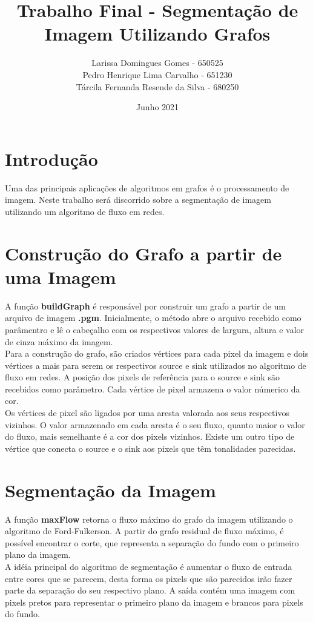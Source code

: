 \documentclass{article}
\title{Trabalho Final - Segmentação de Imagem Utilizando Grafos}
\author{Larissa Domingues Gomes - 650525 \\
Pedro Henrique Lima Carvalho - 651230\\
Tárcila Fernanda Resende da Silva - 680250}
\date{Junho 2021}
\begin{document}
\maketitle

\section{Introdução}
\quad Uma das principais aplicações de algoritmos em grafos é o processamento de imagem. Neste trabalho será discorrido sobre a segmentação de imagem utilizando um algoritmo de fluxo em redes.\\

\section{Construção do Grafo a partir de uma Imagem}
\quad A função \textbf{buildGraph} é responsável por construir um grafo a partir de um arquivo de imagem \textbf{.pgm}. Inicialmente, o método abre o arquivo recebido como parâmentro e lê o cabeçalho com os respectivos valores de largura, altura e valor de cinza máximo da imagem.\\

 Para a construção do grafo, são criados vértices para cada pixel da imagem e dois vértices a mais para serem os respectivos source e sink utilizados no algoritmo de fluxo em redes. A posição dos pixels de referência para o source e sink são recebidos como parâmetro. Cada vértice de pixel armazena o valor númerico da cor.\\
 
 Os vértices de pixel são ligados por uma aresta valorada aos seus respectivos vizinhos. O valor armazenado em cada aresta é o seu fluxo, quanto maior o valor do fluxo, mais semelhante é a cor dos pixels vizinhos. Existe um outro tipo de vértice que conecta o source e o sink aos pixels que têm  tonalidades parecidas.
 
 \section{Segmentação da Imagem}
\quad A função \textbf{maxFlow} retorna o fluxo máximo do grafo da imagem utilizando o algoritmo de Ford-Fulkerson. A partir do grafo residual de fluxo máximo, é possível encontrar o corte, que representa a separação do fundo com o primeiro plano da imagem.\\

A idéia principal do algoritmo de segmentação é aumentar o fluxo de entrada entre cores que se parecem, desta forma os pixels que são parecidos irão fazer parte da separação do seu respectivo plano. A saída contém uma imagem com pixels pretos para representar o primeiro plano da imagem e brancos para pixels do fundo.
\end{document}
